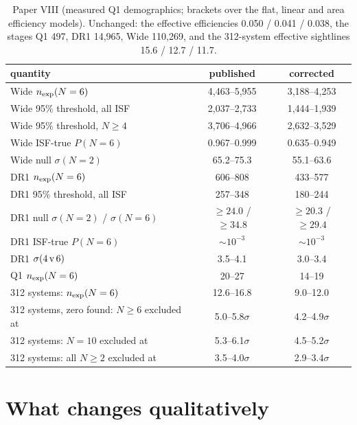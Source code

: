 \documentclass[twocolumn,11pt]{article}
\begin{document}
\begin{table}
\centering
\caption{Paper VIII (measured Q1 demographics; brackets over the flat,
linear and area efficiency models). Unchanged: the effective
efficiencies 0.050 / 0.041 / 0.038, the stages Q1 497, DR1 14,965,
Wide 110,269, and the 312-system effective sightlines 15.6 / 12.7 /
11.7.}
\label{tab:p8}
\small
\setlength{\tabcolsep}{4pt}
\begin{tabular}{lcc}
\toprule
quantity & published & corrected \\
\midrule
Wide $n_{\rm exp}(N=6)$                      & 4,463--5,955 & 3,188--4,253 \\
Wide 95\% threshold, all ISF                 & 2,037--2,733 & 1,444--1,939 \\
Wide 95\% threshold, $N\geq4$                & 3,706--4,966 & 2,632--3,529 \\
Wide ISF-true $P(N=6)$                       & 0.967--0.999 & 0.635--0.949 \\
Wide null $\sigma(N=2)$                      & 65.2--75.3 & 55.1--63.6 \\
DR1 $n_{\rm exp}(N=6)$                       & 606--808 & 433--577 \\
DR1 95\% threshold, all ISF                  & 257--348 & 180--244 \\
DR1 null $\sigma(N=2)$ / $\sigma(N=6)$       & $\geq24.0$ / $\geq34.8$ & $\geq20.3$ / $\geq29.4$ \\
DR1 ISF-true $P(N=6)$                        & $\sim10^{-3}$ & $\sim10^{-3}$ \\
DR1 $\sigma(4\,{\rm v}\,6)$                  & 3.5--4.1 & 3.0--3.4 \\
Q1 $n_{\rm exp}(N=6)$                        & 20--27 & 14--19 \\
312 systems: $n_{\rm exp}(N=6)$              & 12.6--16.8 & 9.0--12.0 \\
312 systems, zero found: $N\geq6$ excluded at & 5.0--5.8$\sigma$ & 4.2--4.9$\sigma$ \\
312 systems: $N=10$ excluded at              & 5.3--6.1$\sigma$ & 4.5--5.2$\sigma$ \\
312 systems: all $N\geq2$ excluded at        & 3.5--4.0$\sigma$ & 2.9--3.4$\sigma$ \\
\bottomrule
\end{tabular}
\end{table}

\section{What changes qualitatively}
\label{sec:qualitative}
\end{document}
